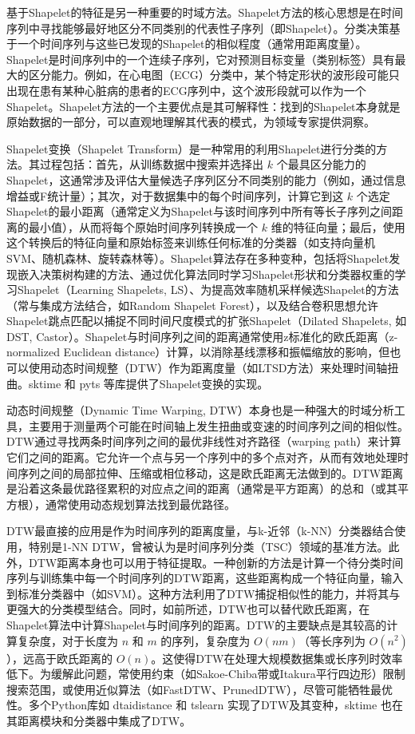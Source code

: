             基于Shapelet的特征是另一种重要的时域方法。Shapelet方法的核心思想是在时间序列中寻找能够最好地区分不同类别的代表性子序列（即Shapelet）。分类决策基于一个时间序列与这些已发现的Shapelet的相似程度（通常用距离度量）。Shapelet是时间序列中的一个连续子序列，它对预测目标变量（类别标签）具有最大的区分能力。例如，在心电图（ECG）分类中，某个特定形状的波形段可能只出现在患有某种心脏病的患者的ECG序列中，这个波形段就可以作为一个Shapelet。Shapelet方法的一个主要优点是其可解释性：找到的Shapelet本身就是原始数据的一部分，可以直观地理解其代表的模式，为领域专家提供洞察。
            
            Shapelet变换（Shapelet Transform）是一种常用的利用Shapelet进行分类的方法。其过程包括：首先，从训练数据中搜索并选择出 $k$ 个最具区分能力的Shapelet，这通常涉及评估大量候选子序列区分不同类别的能力（例如，通过信息增益或F统计量）；其次，对于数据集中的每个时间序列，计算它到这 $k$ 个选定Shapelet的最小距离（通常定义为Shapelet与该时间序列中所有等长子序列之间距离的最小值），从而将每个原始时间序列转换成一个 $k$ 维的特征向量；最后，使用这个转换后的特征向量和原始标签来训练任何标准的分类器（如支持向量机SVM、随机森林、旋转森林等）。Shapelet算法存在多种变种，包括将Shapelet发现嵌入决策树构建的方法、通过优化算法同时学习Shapelet形状和分类器权重的学习Shapelet（Learning Shapelets, LS）、为提高效率随机采样候选Shapelet的方法（常与集成方法结合，如Random Shapelet Forest），以及结合卷积思想允许Shapelet跳点匹配以捕捉不同时间尺度模式的扩张Shapelet（Dilated Shapelets, 如DST, Castor）。Shapelet与时间序列之间的距离通常使用z标准化的欧氏距离（z-normalized Euclidean distance）计算，以消除基线漂移和振幅缩放的影响，但也可以使用动态时间规整（DTW）作为距离度量（如LTSD方法）来处理时间轴扭曲。sktime 和 pyts 等库提供了Shapelet变换的实现。
            
            动态时间规整（Dynamic Time Warping, DTW）本身也是一种强大的时域分析工具，主要用于测量两个可能在时间轴上发生扭曲或变速的时间序列之间的相似性。DTW通过寻找两条时间序列之间的最优非线性对齐路径（warping path）来计算它们之间的距离。它允许一个点与另一个序列中的多个点对齐，从而有效地处理时间序列之间的局部拉伸、压缩或相位移动，这是欧氏距离无法做到的。DTW距离是沿着这条最优路径累积的对应点之间的距离（通常是平方距离）的总和（或其平方根），通常使用动态规划算法找到最优路径。
            
            DTW最直接的应用是作为时间序列的距离度量，与k-近邻（k-NN）分类器结合使用，特别是1-NN DTW，曾被认为是时间序列分类（TSC）领域的基准方法。此外，DTW距离本身也可以用于特征提取。一种创新的方法是计算一个待分类时间序列与训练集中每一个时间序列的DTW距离，这些距离构成一个特征向量，输入到标准分类器中（如SVM）。这种方法利用了DTW捕捉相似性的能力，并将其与更强大的分类模型结合。同时，如前所述，DTW也可以替代欧氏距离，在Shapelet算法中计算Shapelet与时间序列的距离。DTW的主要缺点是其较高的计算复杂度，对于长度为 $n$ 和 $m$ 的序列，复杂度为 $O(nm)$（等长序列为 $O(n^2)$），远高于欧氏距离的 $O(n)$。这使得DTW在处理大规模数据集或长序列时效率低下。为缓解此问题，常使用约束（如Sakoe-Chiba带或Itakura平行四边形）限制搜索范围，或使用近似算法（如FastDTW、PrunedDTW），尽管可能牺牲最优性。多个Python库如 dtaidistance 和 tslearn 实现了DTW及其变种，sktime 也在其距离模块和分类器中集成了DTW。
            
